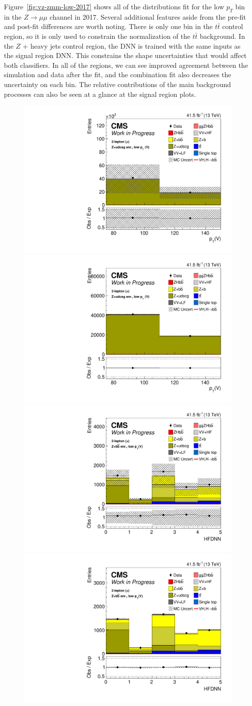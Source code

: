 Figure~\ref{fig:vz-zmm-low-2017} shows all of the distributions fit for the low $p_T$ bin in the
$Z\rightarrow\mu\mu$ channel in 2017.
Several additional features aside from the pre-fit and post-fit differences are worth noting.
There is only one bin in the $t\bar{t}$ control region,
so it is only used to constrain the normalization of the $t\bar{t}$ background.
In the $Z$ + heavy jets control region, the DNN is trained with the same inputs as the signal region DNN.
This constrains the shape uncertainties that would affect both classifiers.
In all of the regions, we can see improved agreement between the simulation and data after the fit, and
the combination fit also decreases the uncertainty on each bin.
The relative contributions of the main background processes can also be seen at a glance at the signal region plots.
%
\begin{figure}
  \centering
  \includegraphics[width=0.35\linewidth]{figures/210323_STXS_VZ_unblinded_XbbVZ_8fe9e9cd_postfitplots/plot_shapes_vhbb_Zmm_2_13TeV2017_prefit}
  \includegraphics[width=0.35\linewidth]{figures/210323_STXS_VZ_unblinded_XbbVZ_8fe9e9cd_postfitplots/plot_shapes_vhbb_Zmm_2_13TeV2017_postfit} \\
  \includegraphics[width=0.35\linewidth]{figures/210323_STXS_VZ_unblinded_XbbVZ_8fe9e9cd_postfitplots/plot_shapes_vhbb_Zmm_3_13TeV2017_prefit}
  \includegraphics[width=0.35\linewidth]{figures/210323_STXS_VZ_unblinded_XbbVZ_8fe9e9cd_postfitplots/plot_shapes_vhbb_Zmm_3_13TeV2017_postfit} \\

\end{figure}
